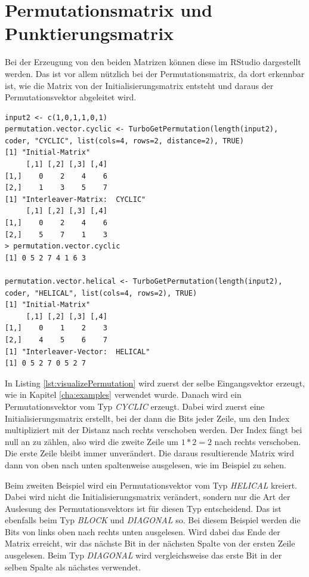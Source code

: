 \section{Permutationsmatrix und Punktierungsmatrix}
\label{sec:visualization_punctuationPermutation}
Bei der Erzeugung von den beiden Matrizen können diese im RStudio dargestellt werden. Das ist vor allem nützlich bei der Permutationsmatrix, da dort erkennbar ist, wie die Matrix von der Initialisierungsmatrix entsteht und daraus der Permutationsvektor abgeleitet wird. 

\begin{lstlisting}[caption=Visualisierung der Permutationsmatrix, label={lst:visualizePermutation}, float=!ht]
input2 <- c(1,0,1,1,0,1)
permutation.vector.cyclic <- TurboGetPermutation(length(input2), coder, "CYCLIC", list(cols=4, rows=2, distance=2), TRUE)
[1] "Initial-Matrix"
     [,1] [,2] [,3] [,4]
[1,]    0    2    4    6
[2,]    1    3    5    7
[1] "Interleaver-Matrix:  CYCLIC"
     [,1] [,2] [,3] [,4]
[1,]    0    2    4    6
[2,]    5    7    1    3
> permutation.vector.cyclic
[1] 0 5 2 7 4 1 6 3

permutation.vector.helical <- TurboGetPermutation(length(input2), coder, "HELICAL", list(cols=4, rows=2), TRUE)
[1] "Initial-Matrix"
     [,1] [,2] [,3] [,4]
[1,]    0    1    2    3
[2,]    4    5    6    7
[1] "Interleaver-Vector:  HELICAL"
[1] 0 5 2 7 0 5 2 7
\end{lstlisting}

In Listing \ref{lst:visualizePermutation} wird zuerst der selbe Eingangsvektor erzeugt, wie in Kapitel \ref{cha:examples} verwendet wurde. Danach wird ein Permutationsvektor vom Typ \emph{CYCLIC} erzeugt. Dabei wird zuerst eine Initialisierungsmatrix erstellt, bei der dann die Bits jeder Zeile, um den Index multipliziert mit der Distanz nach rechts verschoben werden. Der Index fängt bei null an zu zählen, also wird die zweite Zeile um $1*2 = 2$ nach rechts verschoben. Die erste Zeile bleibt immer unverändert. Die daraus resultierende Matrix wird dann von oben nach unten spaltenweise ausgelesen, wie im Beispiel zu sehen.

Beim zweiten Beispiel wird ein Permutationsvektor vom Typ \emph{HELICAL} kreiert. Dabei wird nicht die Initialisierungsmatrix verändert, sondern nur die Art der Auslesung des Permutationsvektors ist für diesen Typ entscheidend. Das ist ebenfalls beim Typ \emph{BLOCK} und \emph{DIAGONAL} so. Bei diesem Beispiel werden die Bits von links oben nach rechts unten ausgelesen. Wird dabei das Ende der Matrix erreicht, wir das nächste Bit in der nächsten Spalte von der ersten Zeile ausgelesen. Beim Typ \emph{DIAGONAL} wird vergleichsweise das erste Bit in der selben Spalte als nächstes verwendet.

